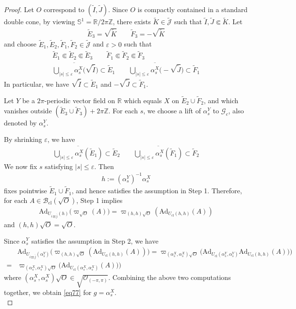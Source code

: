 \documentclass[11pt,b5paper,notitlepage]{article}
\theoremstyle{definition}
\theoremstyle{plain}
\newcommand{\wtd}{\widetilde}
\newcommand{\ovl}{\overline}
\newcommand{\Jtd}{\widetilde{\mathcal J}}
\newcommand{\Ad}{\mathrm{Ad}}
\newcommand{\Zbb}{\mathbb Z}
\newcommand{\Rbb}{\mathbb R}
\newcommand{\Sbb}{{\mathbb S}}
\newcommand{\Gc}{\mathscr G_c}
\newcommand{\eps}{\varepsilon}
\newcommand{\Bcl}{\mathcal B_{\mathrm{cl}}}
\newcommand{\ZOpp}{\sqrt{\mathcal O_{(-\pi,\pi)}}}
\newcommand{\Ucl}{U_{\mathrm{cl}}}
\numberwithin{equation}{section}
\begin{document}
\begin{proof}
Let $O$ correspond to $(\wtd I,\wtd J)$. Since $O$ is compactly contained in a standard double cone, by viewing $\Sbb^1=\Rbb/2\pi\Zbb$, there exists $\wtd K\in\Jtd$ such that $\wtd I,\wtd J\Subset \wtd K$. Let
\begin{align*}
\wtd E_3=\sqrt{\wtd K}\qquad \wtd F_3=-\sqrt{\wtd K}
\end{align*}
and choose $\wtd E_1,\wtd E_2,\wtd F_1,\wtd F_2\in\Jtd$ and $\eps>0$ such that
\begin{gather*}
\wtd E_1\Subset\wtd E_2\Subset \wtd E_3\qquad \wtd F_1\Subset\wtd F_2\Subset \wtd F_3\\
\ovl{\bigcup_{|s|\leq\eps}\alpha^X_s\big(\sqrt{\wtd I}}\big)\subset \wtd E_1\qquad  \ovl{\bigcup_{|s|\leq\eps}\alpha^X_s\big(-\sqrt{\wtd J}}\big)\subset \wtd F_1
\end{gather*}
In particular, we have $\sqrt{\wtd I}\subset\wtd E_1$ and $-\sqrt{\wtd J}\subset\wtd F_1$.

Let $Y$ be a $2\pi$-periodic vector field on $\Rbb$ which equals $X$ on $\wtd E_2\cup\wtd F_2$, and which vanishes outside $(\wtd E_3\cup\wtd F_3)+2\pi\Zbb$. For each $s$, we choose a lift of $\alpha^Y_s$ to $\Gc$, also denoted by $\alpha^Y_s$. 

By shrinking $\eps$, we have
\begin{gather*}
\ovl{\bigcup_{|s|\leq\eps}\alpha^X_s(\wtd E_1)}\subset \wtd E_2\qquad \ovl{\bigcup_{|s|\leq\eps}\alpha^X_s(\wtd F_1)}\subset \wtd F_2
\end{gather*}
We now fix $s$ satisfying $|s|\leq\eps$. Then
\begin{gather*}
h:=(\alpha_s^Y)^{-1}\alpha_s^X
\end{gather*}
fixes pointwise $\wtd E_1\cup\wtd F_1$, and hence satisfies the assumption in Step 1. Therefore, for each $A\in\Bcl(\sqrt O)$, Step 1 implies
\begin{align*}
\Ad_{U_{i\boxtimes\ovl j}(h)}\big(\varpi_{\sqrt O}(A)\big)=\varpi_{(h,h)\sqrt O}(\Ad_{\Ucl(h,h)}(A))
\end{align*}
and $(h,h)\sqrt O=\sqrt O$.

Since $\alpha_s^Y$ satisfies the assumption in Step 2, we have
\begin{align*}
&\Ad_{U_{i\boxtimes\ovl j}(\alpha_s^Y)}\big(\varpi_{(h,h)\sqrt O}(\Ad_{\Ucl(h,h)}(A))\big)=\varpi_{(\alpha_s^X,\alpha_s^X)\sqrt O}\big(\Ad_{\Ucl(\alpha_s^Y,\alpha_s^Y)}\Ad_{\Ucl(h,h)}(A))\big)\\
=&\varpi_{(\alpha_s^X,\alpha_s^X)\sqrt O}\big(\Ad_{\Ucl(\alpha_s^X,\alpha_s^X)}(A))\big)
\end{align*}
where $(\alpha_s^X,\alpha_s^X)\sqrt O\in\ZOpp$. Combining the above two computations together, we obtain \eqref{eq77} for $g=\alpha^X_s$.\\[-1ex]


\end{proof}
\end{document}
